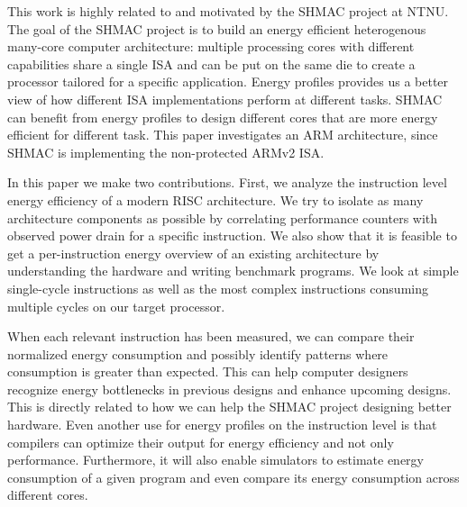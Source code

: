 This work is highly related to and motivated by the SHMAC
project\cite{ntnushmac}\cite{Umuroglu662354}\cite{rusten2012implementing} at NTNU. The goal of
the SHMAC project is to build an energy efficient heterogenous many-core
computer architecture: multiple processing cores with different capabilities
share a single ISA and can be put on the same die to create a processor tailored
for a specific application. Energy profiles provides us a better view of how
different ISA implementations perform at different tasks\cite{kumar2003single}.
SHMAC can benefit from energy profiles to design different cores that are more
energy efficient for different task.  This paper investigates an ARM
architecture, since SHMAC is implementing the non-protected ARMv2 ISA.

In this paper we make two contributions. First, we analyze the instruction level
energy efficiency of a modern RISC architecture. We try to isolate as many
architecture components as possible by correlating performance counters with
observed power drain for a specific instruction. We also show that it is
feasible to get a per-instruction energy overview of an existing architecture by
understanding the hardware and writing benchmark programs. We look at simple
single-cycle instructions as well as the most complex instructions consuming
multiple cycles on our target processor.

When each relevant instruction has been measured, we can compare their
normalized energy consumption and possibly identify patterns where consumption
is greater than expected. This can help computer designers recognize energy
bottlenecks in previous designs and enhance upcoming designs. This is directly
related to how we can help the SHMAC project designing better hardware. Even
another use for energy profiles on the instruction level is that compilers can
optimize their output for energy efficiency and not only performance.
Furthermore, it will also enable simulators to estimate energy consumption of a
given program and even compare its energy consumption across different cores.



